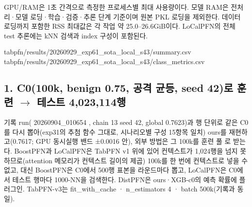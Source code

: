 GPU/\allowbreak{}RAM은 1초 간격으로 측정한 프로세스별 최대 사용량이다. 모델 RAM은 전처리·모델 로딩·학습·검증·추론 단계 기준이며 원본 PKL 로딩을 제외한다. 데이터 로딩까지 포함한 RSS 최대값은 각 작업 약 25.0–26.6GiB이다. LoCalPFN의 전체 test 추론에는 kNN 검색과 index 구성이 포함된다.

tabpfn/\allowbreak{}results/\allowbreak{}20260929\_\allowbreak{}exp61\_\allowbreak{}sota\_\allowbreak{}local\_\allowbreak{}s43/\allowbreak{}summary.csv tabpfn/\allowbreak{}results/\allowbreak{}20260929\_\allowbreak{}exp61\_\allowbreak{}sota\_\allowbreak{}local\_\allowbreak{}s43/\allowbreak{}class\_\allowbreak{}metrics.csv

\subsection*{1. C0(100k, benign 0.75, 공격 균등, seed 42)로 훈련  \ensuremath{\rightarrow}  테스트 4,023,114행}
기록 run( 20260904\_\allowbreak{}010654 , chain 13 seed 42, global 0.7623)과 행 단위로 같은 C0 를 다시 뽑아(exp31의 추첨 함수 그대로, 시나리오별 구성 15항목 일치) ours를 재현하고(0.7617; GPU 동시실행 밴드 ±0.0016 안), 외부 방법은 그 100k를 훈련 풀 로 받는다. BoostPFN과 LoCalPFN은 TabPFN v1 위에 있어 컨텍스트가 1,024행을 넘지 못하므로(attention 메모리가 컨텍스트 길이의 제곱) 100k를 한 번에 컨텍스트로 넣을 수 없고, 대신 BoostPFN은 C0에서 500행 표본을 라운드마다 뽑고, LoCalPFN은 C0에서 테스트 행마다 1000-NN을 검색한다. DistPFN은 ours·XGB-c0의 예측 확률에 플러그인. TabPFN-v3는 fit\_\allowbreak{}with\_\allowbreak{}cache · n\_\allowbreak{}estimators 4 · batch 500k(기록과 동일).

